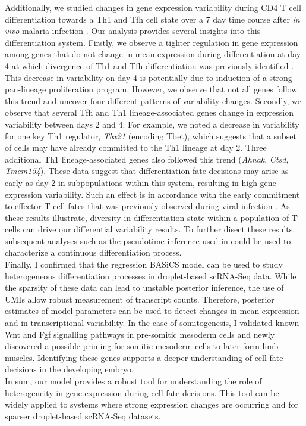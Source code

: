 Additionally, we studied changes in gene expression variability during CD4\plus{} T cell differentiation towards a Th1 and Tfh cell state over a 7 day time course after \textit{in vivo} malaria infection \citep{Lonnberg2017}. Our analysis provides several insights into this differentiation system. Firstly, we observe a tighter regulation in gene expression among genes that do not change in mean expression during differentiation at day 4 at which divergence of Th1 and Tfh differentiation was previously identified \citep{Lonnberg2017}. This decrease in variability on day 4 is potentially due to induction of a strong pan-lineage proliferation program. However, we observe that not all genes follow this trend and uncover four different patterns of variability changes. Secondly, we observe that several Tfh and Th1 lineage-associated genes change in expression variability between days 2 and 4. For example, we noted a decrease in variability for one key Th1 regulator, \textit{Tbx21} (encoding Tbet), which suggests that a subset of cells may have already committed to the Th1 lineage at day 2. Three additional Th1 lineage-associated genes also followed this trend (\textit{Ahnak}, \textit{Ctsd}, \textit{Tmem154}). These data suggest that differentiation fate decisions may arise as early as day 2 in subpopulations within this system, resulting in high gene expression variability. Such an effect is in accordance with the early commitment to effector T cell fates that was previously observed during viral infection \citep{Choi2011}. As these results illustrate, diversity in differentiation state within a population of T cells can drive our differential variability results. To further disect these results, subsequent analyses such as the pseudotime inference used in \cite{Lonnberg2017} could be used to characterize a continuous differentiation process.\\

Finally, I confirmed that the regression BASiCS model can be used to study heterogeneous differentiation processes in droplet-based scRNA-Seq data. While the sparsity of these data can lead to unstable posterior inference, the use of UMIs allow robust measurement of transcript counts. Therefore, posterior estimates of model parameters can be used to detect changes in mean expression and in transcriptional variability. In the case of somitogenesis, I validated known Wnt and Fgf signalling pathways in pre-somitic mesoderm cells and newly discovered a possible priming for somitic mesoderm cells to later form limb muscles. Identifying these genes supports a deeper understanding of cell fate decisions in the developing embryo.\\

In sum, our model provides a robust tool for understanding the role of heterogeneity in gene expression during cell fate decisions. This tool can be widely applied to systems where strong expression changes are occurring and for sparser droplet-based scRNA-Seq datasets.


